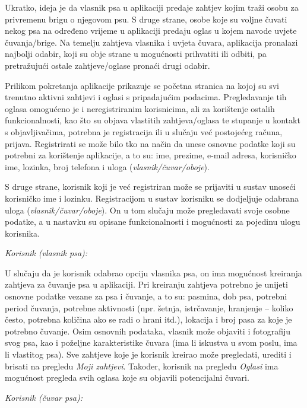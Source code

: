 		Ukratko, ideja je da vlasnik psa u aplikaciji predaje zahtjev kojim traži osobu za privremenu brigu o njegovom psu. S druge strane, osobe koje su voljne čuvati nekog psa na određeno vrijeme u aplikaciji predaju oglas u kojem navode uvjete čuvanja/brige. Na temelju zahtjeva vlasnika i uvjeta čuvara, aplikacija pronalazi najbolji odabir, koji su obje strane u mogućnosti prihvatiti ili odbiti, pa pretražujući  ostale zahtjeve/oglase pronaći drugi odabir. 
		
		Prilikom pokretanja aplikacije prikazuje se početna stranica na kojoj su svi trenutno aktivni zahtjevi i oglasi s pripadajućim podacima. Pregledavanje tih oglasa omogućeno je i neregistriranim korisnicima, ali za korištenje ostalih funkcionalnosti, kao što su objava vlastitih zahtjeva/oglasa te stupanje u kontakt s objavljivačima, potrebna je registracija ili u slučaju već postojećeg računa, prijava. Registrirati se može bilo tko na način da unese osnovne podatke koji su potrebni za korištenje aplikacije, a to su: ime, prezime, e-mail adresa, korisničko ime, lozinka, broj telefona i uloga (\textit{vlasnik/čuvar/oboje}). 
		
		S druge strane, korisnik koji je već registriran može se prijaviti u sustav unoseći korisničko ime i lozinku. Registracijom u sustav korisniku se dodjeljuje odabrana uloga (\textit{vlasnik/čuvar/oboje}). On u tom slučaju može pregledavati svoje osobne podatke, a u nastavku su opisane funkcionalnosti i mogućnosti za pojedinu ulogu korisnika. 
		
		\textit{Korisnik (vlasnik psa):}
		
		U slučaju da je korisnik odabrao opciju vlasnika psa, on ima mogućnost kreiranja zahtjeva za čuvanje psa u aplikaciji. Pri kreiranju zahtjeva potrebno je unijeti osnovne podatke vezane za psa i čuvanje, a to su: pasmina, dob psa, potrebni period čuvanja, potrebne aktivnosti (npr. šetnja, istrčavanje, hranjenje – koliko često, potrebna količina ako se radi o hrani itd.), lokacija i broj pasa za koje je potrebno čuvanje. Osim osnovnih podataka, vlasnik može objaviti i fotografiju svog psa, kao i poželjne karakteristike čuvara (ima li iskustva u svom poslu, ima li vlastitog psa). Sve zahtjeve koje je korisnik kreirao može pregledati, urediti i brisati na pregledu \textit{Moji zahtjevi}. Također, korisnik na pregledu \textit{Oglasi} ima mogućnost pregleda svih oglasa koje su objavili potencijalni čuvari.
		
		\textit{Korisnik (čuvar psa):}
		
